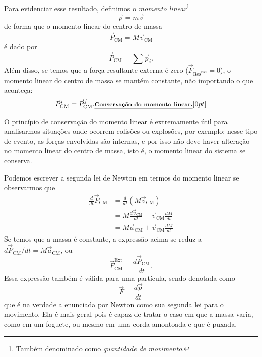 Para evidenciar esse resultado, definimos o \emph{momento linear}\footnote{Também denominado como \emph{quantidade de movimento}.}
\begin{equation}
  \vec{p} = m\vec{v}
\end{equation}
%
de forma que o momento linear do centro de massa
\begin{equation}
  \vec{P}_{\textrm{CM}} = M\vec{v}_{\textrm{CM}}
\end{equation}
%
é dado por
\begin{equation}
  \vec{P}_{\textrm{CM}} = \sum \vec{p}_i.
\end{equation}
%
Além disso, se temos que a força resultante externa é zero ($\vec{F}_{\textrm{Res}^\textrm{Ext}} = 0$), o momento linear do centro de massa se mantém constante, não importando o que aconteça:
\begin{equation}
  \vec{P}_{\textrm{CM}}^i = \vec{P}_{\textrm{CM}}^f. \relax{\footnotesize\emph{\textbf{Conservação do momento linear.}}}[0pt]
\end{equation}

O princípio de conservação do momento linear é extremamente útil para analisarmos situações onde ocorrem colisões ou explosões, por exemplo: nesse tipo de evento, as forças envolvidas são internas, e por isso não deve haver alteração no momento linear do centro de massa, isto é, o momento linear do sistema se conserva.

Podemos escrever a segunda lei de Newton em termos do momento linear se observarmos que
\begin{align}
  \frac{d}{dt} \vec{P}_{\textrm{CM}} &= \frac{d}{dt}(M\vec{v}_{\textrm{CM}}) \\
  &= M\frac{d\vec{v}_{\textrm{CM}}}{dt} + \vec{v}_{\textrm{CM}}\frac{dM}{dt} \\
  &= M\vec{a}_{\textrm{CM}} + \vec{v}_{\textrm{CM}}\frac{dM}{dt}
\end{align}
%
Se temos que a massa é constante, a expressão acima se reduz a $d\vec{P}_{\textrm{CM}}/dt = M\vec{a}_{\textrm{CM}}$, ou
\begin{equation}
  \vec{F}_{\textrm{CM}}^{\textrm{Ext}} = \frac{d\vec{P}_{\textrm{CM}}}{dt}.
\end{equation}
%
Essa expressão também é válida para uma partícula, sendo denotada como
\begin{equation}\label{Eq:SegundaLeiDerMomento}
  \vec{F} = \frac{d\vec{p}}{dt}
\end{equation}
%
que é na verdade a enunciada por Newton como sua segunda lei para o movimento. Ela é mais geral pois é capaz de tratar o caso em que a massa varia, como em um foguete, ou mesmo em uma corda amontoada e que é puxada.


